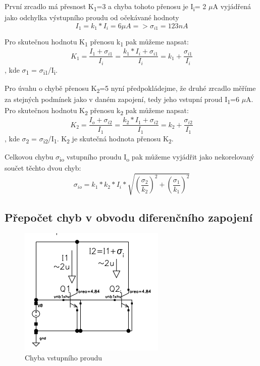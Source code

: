 První zrcadlo má přesnost K\textsubscript{1}=3 a chyba tohoto přenosu je I\textsubscript{i}= 2 $\mu$A vyjádřená jako odchylka výstupního proudu od očekávané hodnoty
\begin{equation}
I_{1}=k_{1}*I_{i}=6\mu A => \sigma_{i1}=123nA
\end{equation}

Pro skutečnou hodnotu K\textsubscript{1} přenosu k\textsubscript{1} pak můžeme napsat:
\begin{equation}
K_{1} = \frac{I_{1}+\sigma_{i1}}{I_{i}}=\frac{k_{1}*I_{i}+\sigma_{i1}}{I_{i}} = k_{1}+\frac{\sigma_{i1}}{I_{i}}
\end{equation}
, kde $\sigma$\textsubscript{1} = $\sigma$\textsubscript{i1}/I\textsubscript{i}.

Pro úvahu o chybě přenosu K\textsubscript{2}=5 nyní předpokládejme, že druhé zrcadlo měříme za stejných podmínek jako v daném zapojení, tedy jeho vstupní proud I\textsubscript{1}=6 $\mu$A. Pro skutečnou hodnotu K\textsubscript{2} přenosu k\textsubscript{2} pak můžeme napsat:
\begin{equation}
K_{2} = \frac{I_{o}+\sigma_{i2}}{I_{1}}=\frac{k_{2}*I_{1}+\sigma_{i2}}{I_{1}} = k_{2}+\frac{\sigma_{i2}}{I_{1}}
\end{equation}
, kde $\sigma$\textsubscript{2} = $\sigma$\textsubscript{i2}/I\textsubscript{1}.
K\textsubscript{2} je skutečná hodnota přenosu K\textsubscript{2}.

Celkovou chybu $\sigma$\textsubscript{io} vstupního proudu I\textsubscript{o} pak můžeme vyjádřit jako nekorelovaný součet těchto dvou chyb:
\begin{equation}
\sigma_{io}=k_{1}*k_{2}*I_{i}*\sqrt{(\frac{\sigma_{2}}{k_{2}})^2+({\frac{\sigma_{1}}{k_{1}}})^2}
\end{equation}



\subsection{Přepočet chyb v obvodu diferenčního zapojení}

\begin{figure}[h]
   \begin{center}
     \includegraphics[scale=1]{images/Prepocet.png}
   \end{center}
   \caption{Chyba vstupního proudu}
\end{figure}

